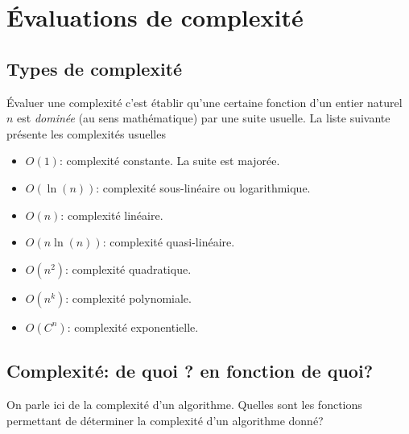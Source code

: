 


\section{\'Evaluations de complexité}
\subsection{Types de complexité}
\'Evaluer une complexité c'est établir qu'une certaine fonction d'un entier naturel $n$ est \emph{dominée} (au sens mathématique) par une suite usuelle.\newline
La liste suivante présente les  complexités usuelles
\begin{itemize}
  \item $O(1)$: complexité constante. La suite est majorée. 
  \item $O(\ln(n))$: complexité sous-linéaire ou logarithmique.
  \item $O(n)$: complexité linéaire.
  \item $O(n\ln(n))$: complexité quasi-linéaire.
  \item $O(n^2)$: complexité quadratique.
  \item $O(n^k)$: complexité polynomiale.
  \item $O(C^n)$: complexité exponentielle.
\end{itemize}
\subsection{Complexité: de quoi ? en fonction de quoi?}
On parle ici de la complexité d'un algorithme. Quelles sont les fonctions permettant de déterminer la complexité d'un algorithme donné? 

